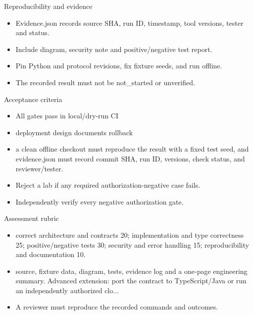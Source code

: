 \documentclass[aspectratio=169,10pt]{beamer}
\begin{document}
\begin{frame}{Reproducibility and evidence}
\small
\begin{itemize}
\item Evidence.json records source SHA, run ID, timestamp, tool versions, tester and status.
\item Include diagram, security note and positive/negative test report.
\item Pin Python and protocol revisions, fix fixture seeds, and run offline.
\item The recorded result must not be not\_started or unverified.
\end{itemize}

\end{frame}

\begin{frame}{Acceptance criteria}
\small
\begin{itemize}
\item All gates pass in local/dry-run CI
\item deployment design documents rollback
\item a clean offline checkout must reproduce the result with a fixed test seed, and evidence.json must record commit SHA, run ID, versions, check status, and reviewer/tester.
\item Reject a lab if any required authorization-negative case fails.
\item Independently verify every negative authorization gate.
\end{itemize}

\end{frame}

\begin{frame}{Assessment rubric}
\small
\begin{itemize}
\item correct architecture and contracts 20; implementation and type correctness 25; positive/negative tests 30; security and error handling 15; reproducibility and documentation 10.
\item source, fixture data, diagram, tests, evidence log and a one-page engineering summary. Advanced extension: port the contract to TypeScript/Java or run an independently authorized clo...
\item A reviewer must reproduce the recorded commands and outcomes.
\end{itemize}

\end{frame}
\end{document}

